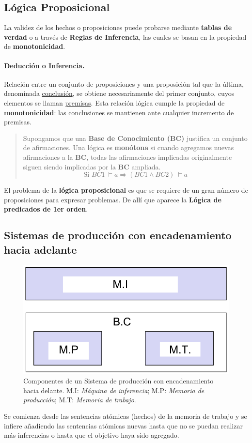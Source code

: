 \documentclass[10pt,a4paper]{article}
\begin{document}
\subsection{Lógica Proposicional}

La validez de los hechos o proposiciones puede probarse mediante \textbf{tablas de verdad} o a través de \textbf{Reglas de Inferencia}, las cuales se basan en la propiedad de \textbf{monotonicidad}.

\paragraph{Deducción o Inferencia.}
Relación entre un conjunto de proposiciones y una proposición tal que la última, denominada \underline{conclusión}, se obtiene necesariamente del primer conjunto, cuyos elementos se llaman \underline{premisas}.  Esta relación lógica cumple la propiedad de \textbf{monotonicidad}: las conclusiones se mantienen ante cualquier incremento de premisas.

\begin{quote}
Supongamos que una \textbf{Base de Conocimiento (BC)} justifica un conjunto de afirmaciones. Una lógica es \textbf{monótona} si cuando agregamos nuevas afirmaciones a la \textbf{BC}, todas las afirmaciones implicadas originalmente siguen siendo implicadas por la \textbf{BC} ampliada.
\[\text{Si }BC1 \: \models a \Rightarrow (BC1 \wedge BC2)\: \models a\]
\end{quote}

El problema de la \textbf{lógica proposicional} es que se requiere de un gran número de proposiciones para expresar problemas. De allí que aparece la \textbf{Lógica de predicados de 1er orden}.

\subsection{Sistemas de producción con encadenamiento hacia adelante}
\begin{figure}
  \label{fig:encadenamiento}
  \caption{Componentes de un Sistema de producción con encadenamiento hacia delante. M.I: \textit{Máquina de inferencia}; M.P: \textit{Memoria de producción}; M.T: \textit{Memoria de trabajo}.}
  \centering
  \hbox{\includegraphics[width=0.35\textwidth-\fboxrule-\fboxrule]{encadenamiento.png}}  
\end{figure}
Se comienza desde las sentencias atómicas (hechos) de la memoria de trabajo y se infiere añadiendo las sentencias atómicas nuevas hasta que no se puedan realizar más inferencias o hasta que el objetivo haya sido agregado.
\end{document}
